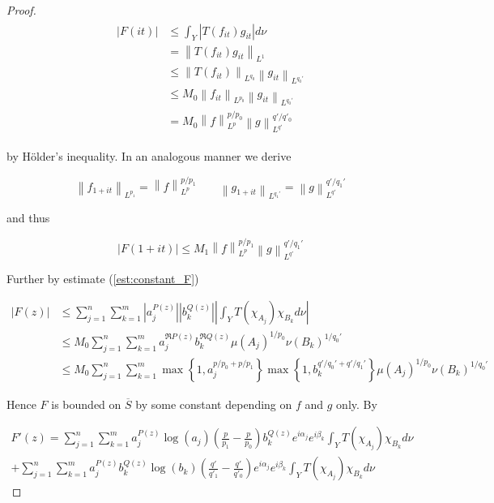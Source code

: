 \begin{proof}
\begin{gather*}
	\begin{aligned}
		\left| F(it) \right| &\leqslant \int_Y \left| T(f_{it})g_{it}\right| d\nu\\
		&= \left\|T(f_{it}) g_{it}\right\|_{L^1}\\
		&\leqslant \left\|T(f_{it})\right\|_{L^{q_0}}\left\|g_{it}\right\|_{L^{q_0'}}\\
		&\leqslant M_0 \left\|f_{it}\right\|_{L^{p_0}} \left\|g_{it}\right\|_{L^{q_0'}}\\
		&= M_0 \left\|f\right\|_{L^p}^{p/p_0} \left\|g\right\|_{L^{q'}}^{q'/q'_0}
	\end{aligned}
\end{gather*}

by H\"older's inequality. In an analogous manner we derive
				
\begin{equation*}
	\left\|f_{1 + it}\right\|_{L^{p_1}} = \left\|f\right\|_{L^p}^{p/p_1} \qquad \left\|g_{1 + it}\right\|_{L^{q_1'}} = \left\|g\right\|_{L^{q'}}^{q'/q_1'}
\end{equation*}

and thus 
				
\begin{equation*}
	\left| F(1 + it)\right| \leqslant M_1 \left\|f\right\|_{L^p}^{p/p_1}\left\|g\right\|_{L^{q'}}^{q'/q_1'}
\end{equation*}	

Further by estimate (\ref{est:constant_F}) 

\begin{equation*}
	\begin{aligned}
		\left| F(z)\right| &\leqslant \sum_{j = 1}^n\sum_{k = 1}^m \left| a_j^{P(z)}\right| \left| b_k^{Q(z)}\right| \left| \int_Y T(\chi_{A_j})\chi_{B_k} d\nu\right|\\
		&\leqslant M_0\sum_{j = 1}^n\sum_{k = 1}^m a_j^{\Re P(z)}b_k^{\Re Q(z)}\mu\left(A_j\right)^{1/p_0}\nu\left(B_k\right)^{1/q_0'}\\
		&\leqslant M_0\sum_{j = 1}^n\sum_{k = 1}^m \max\left\{ 1, a_j^{p/p_0 + p/p_1}\right\} \max\left\{1,b_k^{q'/q_0' + q'/q_1'}\right\}\mu\left(A_j\right)^{1/p_0}\nu\left(B_k\right)^{1/q_0'}
	\end{aligned}
\end{equation*}


Hence $F$ is bounded on $\overline{S}$ by some constant depending on $f$ and $g$ only. By 

\begin{multline*}
	F'(z) = \sum_{j = 1}^n\sum_{k = 1}^m a^{P(z)}_j\log \left( a_j \right) \left( \frac{p}{p_1} - \frac{p}{p_0} \right) b_k^{Q(z)}e^{i\alpha_j} e^{i\beta_k} \int_YT(\chi_{A_j})\chi_{B_k}d\nu \\
	+  \sum_{j = 1}^n\sum_{k = 1}^m a^{P(z)}_jb_k^{Q(z)}\log\left( b_k \right)\left( \frac{q'}{q'_1} - \frac{q'}{q'_0} \right)e^{i\alpha_j} e^{i\beta_k} \int_YT(\chi_{A_j})\chi_{B_k}d\nu 
\end{multline*}


\end{proof}
